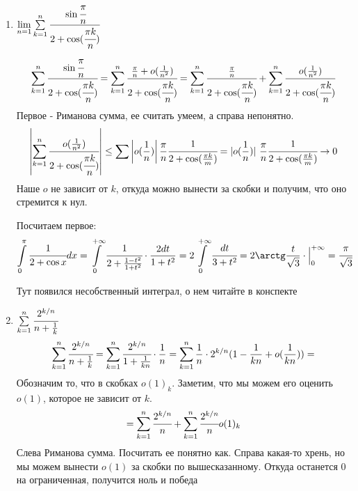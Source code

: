\begin{enumerate}
    \item $
    \lim\limits_{n=1}\sum\limits_{k=1}^n \cfrac{\sin \cfrac{\pi}{n}}{2+\cos(\cfrac{\pi k}{n})}$
    $$\sum\limits_{k=1}^n \cfrac{\sin \cfrac{\pi}{n}}{2+\cos(\cfrac{\pi k}{n})} = \sum\limits_{k=1}^n \cfrac{\frac{\pi}{n}+o(\frac{1}{n^2})}{2+\cos(\cfrac{\pi k}{n})} =\sum\limits_{k=1}^n \cfrac{\frac{\pi}{n}}{2+\cos(\cfrac{\pi k}{n})} + \sum\limits_{k=1}^n \cfrac{o(\frac{1}{n^2})}{2+\cos(\cfrac{\pi k}{n})} $$
    Первое - Риманова сумма, ее считать умеем, а справа непонятно.
$$\left|\sum\limits_{k=1}^n \cfrac{o(\frac{1}{n^2})}{2+\cos(\cfrac{\pi k}{n})}\right | \leq \sum \left|o(\frac{1}{n})\right|\frac{\pi}{n}\cfrac{1}{2+\cos(\frac{\pi k}{m})} = |o(\frac{1}{n})|\ \frac{\pi}{n}\cfrac{1}{2+\cos(\frac{\pi k}{m})} \rightarrow 0 $$
Наше $o$ не зависит от $k$, откуда можно вынести за скобки и получим, что оно стремится к нул.

    Посчитаем первое:
    $$\integral{0}{\pi} \cfrac{1}{2+\cos x}dx = \integral{0}{+\infty} \cfrac{1}{2 + \frac{1-t^2}{1+t^2}}\cdot \frac{2dt}{1+t^2} =  2\integral{0}{+\infty} \cfrac{dt}{3+t^2} = 2 \arctg \frac{t}{\sqrt{3}}\cdot \Big|_0^{+\infty}=\cfrac{\pi}{\sqrt{3}}$$

    Тут появился несобственный интеграл, о нем читайте в конспекте
    \item $\sum\limits_{k=1}^n \cfrac{2^{k/n}}{n+\frac{1}{k}}$
    $$\sum\limits_{k=1}^n \cfrac{2^{k/n}}{n+\frac{1}{k}} = \sum\limits_{k=1}^n \cfrac{2^{k/n}}{1+\frac{1}{kn}} \cdot \frac{1}{n}= \sum\limits_{k=1}^n \frac{1}{n}\cdot 2^{k/n}(1-\frac{1}{kn}+o(\frac{1}{kn})) =$$
    Обозначим то, что в скобках $o(1)_k$. Заметим, что мы можем его оценить $o(1)$, которое не зависит от $k$.
    $$=\sum\limits_{k=1}^n \cfrac{2^{k/n}}{n} + \sum\limits_{k=1}^n \cfrac{2^{k/n}}{n} o(1)_k$$
    Слева Риманова сумма. Посчитать ее понятно как. Справа какая-то хрень, но мы можем вынести $o(1)$ за скобки по вышесказанному. Откуда останется 0 на ограниченная, получится ноль и победа

\end{enumerate}